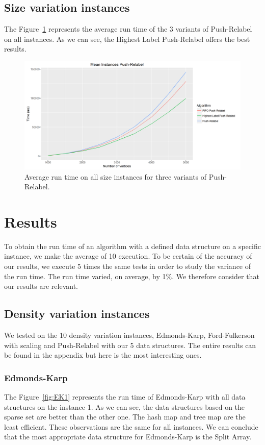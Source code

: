 \subsection{Size variation instances}
The Figure~\ref{fig:PRsize} represents the average run time of the 3 variants of Push-Relabel on all instances. As we can see, the Highest Label Push-Relabel offers the best results.

\begin{figure}[H]
\includegraphics[scale=0.5]{images/meanPRsize.png}
\caption{Average run time on all size instances for three variants of Push-Relabel.}
\label{fig:PRsize}
\end{figure}

\section{Results}
To obtain the run time of an algorithm with a defined data structure on a specific instance, we make the average of 10 execution. To be certain of the accuracy of our results, we execute 5 times the same tests in order to study the variance of the run time. The run time varied, on average, by 1\%. We therefore consider that our results are relevant.

\subsection{Density variation instances}
We tested on the 10 density variation instances, Edmonds-Karp, Ford-Fulkerson with scaling and Push-Relabel with our 5 data structures. The entire results can be found in the appendix but here is the most interesting ones.

\subsubsection{Edmonds-Karp}
The Figure~\ref{fig:EK1} represents the run time of Edmonds-Karp with all data structures on the instance 1. As we can see, the data structures based on the sparse set are better than the other one. The hash map and tree map are the least efficient. These observations are the same for all instances. We can conclude that the most appropriate data structure for Edmonds-Karp is the Split Array.

